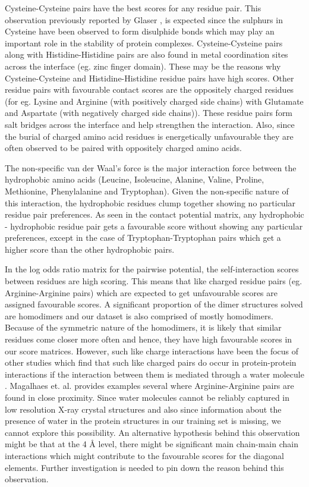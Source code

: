 \par
Cysteine-Cysteine pairs have the best scores for any residue pair. This observation previously reported by Glaser \citep{Glaser2001}, is expected since the sulphurs in Cysteine have been observed to form disulphide bonds which  may play an important role in the stability of protein complexes. Cysteine-Cysteine pairs along with Histidine-Histidine pairs are also found in metal coordination sites across the interface (eg. zinc finger domain). These may be the reasons why Cysteine-Cysteine and Histidine-Histidine residue pairs have high scores. Other residue pairs with favourable contact scores are the oppositely charged residues (for eg. Lysine and Arginine (with positively charged side chains) with Glutamate and Aspartate (with negatively charged side chains)). These residue pairs form salt bridges across the interface and help strengthen the interaction. Also, since the burial of charged amino acid residues is energetically unfavourable they are often observed to be paired with oppositely charged amino acids.
\par
The non-specific van der Waal's force is the major interaction force between the hydrophobic amino acids (Leucine, Isoleucine, Alanine, Valine, Proline, Methionine, Phenylalanine and Tryptophan). Given the non-specific nature of this interaction, the hydrophobic residues clump together showing no particular residue pair preferences. As seen in the contact potential matrix, any hydrophobic - hydrophobic residue pair gets a favourable score without showing any particular preferences, except in the case of Tryptophan-Tryptophan pairs which get a higher score than the other hydrophobic pairs.

 In the log odds ratio matrix for the pairwise potential, the self-interaction scores between residues are high scoring. This means that like charged residue pairs (eg. Arginine-Arginine pairs) which are expected to get unfavourable scores are assigned favourable scores. A significant proportion of the dimer structures solved are homodimers and our dataset is also comprised of mostly homodimers. Because of the symmetric nature of the homodimers, it is likely that similar residues come closer more often and hence, they have high favourable scores in our score matrices. However, such like charge interactions have been the focus of other studies \citep{Magalhaes1994, Pednekar2009} which find that such like charged pairs do occur in protein-protein interactions if the interaction between them is mediated through a water molecule \citep{Heyda2010}. Magalhaes et. al. \citep{Magalhaes1994} provides examples several where Arginine-Arginine pairs are found in close proximity. Since water molecules cannot be reliably captured in low resolution X-ray crystal structures and also since information about the presence of water in the protein structures in our training set is missing, we cannot explore this possibility. An alternative hypothesis behind this observation might be that at the 4 \AA \; level, there might be significant main chain-main chain interactions which might contribute to the favourable scores for the diagonal elements. Further investigation is needed to pin down the reason behind this observation.

